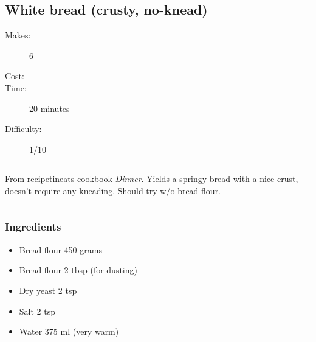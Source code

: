 \documentclass[]{article}
\begin{document}
\subsection*{\center\huge White bread (crusty, no-knead)}
\begin{description}
\item[Makes:] 6 
\item[Cost:] \textdollar
\item[Time:] 20 minutes
\item[Difficulty:] 1/10
\end{description}
\vspace{0.2cm}\hrule\vspace{0.5cm}
\begin{adjustwidth}{0.5 cm}{0.5 cm}

From recipetineats cookbook \textit{Dinner}. Yields a springy bread with a nice crust, doesn't require any kneading. Should try w/o bread flour. \hfill{}\color{black}

\end{adjustwidth}
\vspace{0.5cm}\hrule
\subsubsection*{\Large Ingredients}
\begin{multicols}{2}
\begin{itemize}
 \item Bread flour \hfill 450 grams
 \item Bread flour \hfill 2 tbsp (for dusting)
 \item Dry yeast \hfill 2 tsp
 \item Salt \hfill 2 tsp
 \item Water \hfill 375 ml (very warm)
\end{itemize}
\end{multicols}
\end{document}
